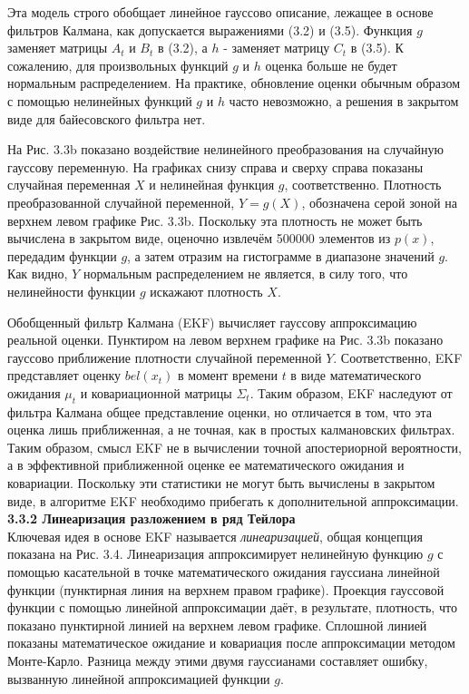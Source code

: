 \documentclass[10pt,a4paper]{article}
\begin{document}
Эта модель строго обобщает линейное гауссово описание, лежащее в основе фильтров Калмана, как допускается выражениями (3.2) и (3.5). Функция $g$ заменяет матрицы $A_t$ и $B_t$ в (3.2), а $h$ - заменяет матрицу $C_t$ в (3.5). К сожалению, для произвольных функций $g$ и $h$ оценка больше не будет нормальным распределением. На практике, обновление оценки обычным образом с помощью нелинейных функций $g$ и $h$ часто невозможно, а решения в закрытом виде для байесовского фильтра нет.

На Рис. 3.3b показано воздействие нелинейного преобразования на случайную гауссову переменную. На графиках снизу справа и сверху справа показаны случайная переменная $X$ и нелинейная функция $g$, соответственно. Плотность преобразованной случайной переменной, $Y = g(X)$, обозначена серой зоной на верхнем левом графике Рис. 3.3b. Поскольку эта плотность не может быть вычислена в закрытом виде, оценочно извлечём 500000 элементов из $p(x)$, передадим функции $g$, а затем отразим на гистограмме в диапазоне значений $g$. Как видно, $Y$ нормальным распределением не является, в силу того, что нелинейности функции $g$ искажают плотность $X$.

Обобщенный фильтр Калмана (EKF) вычисляет гауссову аппроксимацию реальной оценки. Пунктиром на левом верхнем графике на Рис. 3.3b показано гауссово приближение плотности случайной переменной $Y$. Соответственно, EKF представляет оценку $bel(x_t)$ в момент времени $t$ в виде математического ожидания $\mu_t$ и ковариационной матрицы $\varSigma_t$. Таким образом, EKF наследуют от фильтра Калмана общее представление оценки, но отличается в том, что эта оценка лишь приближенная, а не точная, как в простых калмановских фильтрах. Таким образом, смысл EKF не в вычислении точной апостериорной вероятности, а в эффективной приближенной оценке ее математического ожидания и ковариации. Поскольку эти статистики не могут быть вычислены в закрытом виде, в алгоритме EKF необходимо прибегать к дополнительной аппроксимации.\\

\textbf{3.3.2 Линеаризация разложением в ряд Тейлора}\\

Ключевая идея в основе EKF называется \textit{линеаризацией}, общая концепция показана на Рис. 3.4. Линеаризация аппроксимирует нелинейную функцию $g$ с помощью касательной в точке математического ожидания гауссиана линейной функции (пунктирная линия на верхнем правом графике). Проекция гауссовой функции с помощью линейной аппроксимации даёт, в результате, плотность, что показано пунктирной линией на верхнем левом графике. Сплошной линией показаны математическое ожидание и ковариация после аппроксимации методом Монте-Карло. Разница между этими двумя гауссианами составляет ошибку, вызванную линейной аппроксимацией функции $g$.
\end{document}
